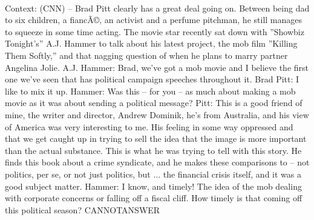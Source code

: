 \documentclass[11pt,a4paper, onecolumn]{article}
\begin{document}
\\ Context: (CNN) -- Brad Pitt clearly has a great deal going on. Between being dad to six children, a fiancÃ©, an activist and a perfume pitchman, he still manages to squeeze in some time acting. The movie star recently sat down with ''Showbiz Tonight's'' A.J. Hammer to talk about his latest project, the mob film ''Killing Them Softly,'' and that nagging question of when he plans to marry partner Angelina Jolie. A.J. Hammer: Brad, we've got a mob movie and I believe the first one we've seen that has political campaign speeches throughout it. Brad Pitt: I like to mix it up. Hammer: Was this -- for you -- as much about making a mob movie as it was about sending a political message? Pitt: This is a good friend of mine, the writer and director, Andrew Dominik, he's from Australia, and his view of America was very interesting to me. His feeling in some way oppressed and that we get caught up in trying to sell the idea that the image is more important than the actual substance. This is what he was trying to tell with this story. He finds this book about a crime syndicate, and he makes these comparisons to -- not politics, per se, or not just politics, but ... the financial crisis itself, and it was a good subject matter. Hammer: I know, and timely! The idea of the mob dealing with corporate concerns or falling off a fiscal cliff. How timely is that coming off this political season? CANNOTANSWER
\end{document}
